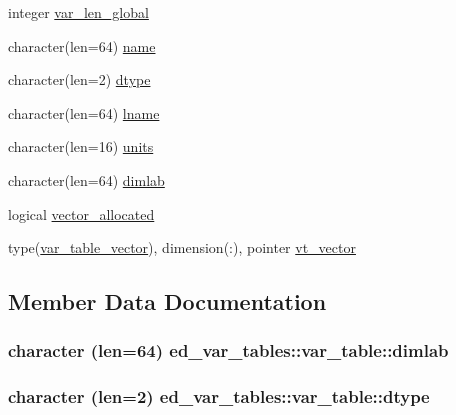 \begin{DoxyCompactItemize}
integer \hyperlink{structed__var__tables_1_1var__table_a91dcf30550c2ee08ef0b4d74e7b8b64f}{var\+\_\+len\+\_\+global}
\item 
character(len=64) \hyperlink{structed__var__tables_1_1var__table_a0af071c5053800dc0920095f9ad100e3}{name}
\item 
character(len=2) \hyperlink{structed__var__tables_1_1var__table_a9c4a28ac74562c96c391f23cc8129805}{dtype}
\item 
character(len=64) \hyperlink{structed__var__tables_1_1var__table_a8e810273668252a3361505190f597c1e}{lname}
\item 
character(len=16) \hyperlink{structed__var__tables_1_1var__table_a08749e252d2a12144da6bf5bd1956f26}{units}
\item 
character(len=64) \hyperlink{structed__var__tables_1_1var__table_a0909c2a3703ab2bdf07815ad0ba14aae}{dimlab}
\item 
logical \hyperlink{structed__var__tables_1_1var__table_a41255913720040623a6bf9dd5b8267c5}{vector\+\_\+allocated}
\item 
type(\hyperlink{structed__var__tables_1_1var__table__vector}{var\+\_\+table\+\_\+vector}), dimension(\+:), pointer \hyperlink{structed__var__tables_1_1var__table_a3eacba058cb9fcc8bef162cbcfb0d106}{vt\+\_\+vector}
\end{DoxyCompactItemize}


\subsection{Member Data Documentation}
\subsubsection[{\texorpdfstring{dimlab}{dimlab}}]{\setlength{\rightskip}{0pt plus 5cm}character (len=64) ed\+\_\+var\+\_\+tables\+::var\+\_\+table\+::dimlab}\hypertarget{structed__var__tables_1_1var__table_a0909c2a3703ab2bdf07815ad0ba14aae}{}\label{structed__var__tables_1_1var__table_a0909c2a3703ab2bdf07815ad0ba14aae}
\subsubsection[{\texorpdfstring{dtype}{dtype}}]{\setlength{\rightskip}{0pt plus 5cm}character (len=2) ed\+\_\+var\+\_\+tables\+::var\+\_\+table\+::dtype}\hypertarget{structed__var__tables_1_1var__table_a9c4a28ac74562c96c391f23cc8129805}{}\label{structed__var__tables_1_1var__table_a9c4a28ac74562c96c391f23cc8129805}
